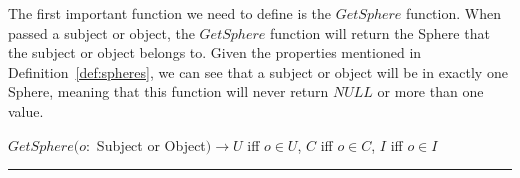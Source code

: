 

\noindent The first important function we need to define is the $GetSphere$
function. When passed a subject or object, the $GetSphere$ function will return
the Sphere that the subject or object belongs to. Given the properties mentioned
in Definition~\ref{def:spheres}, we can see that a subject or object will be in
exactly one Sphere, meaning that this function will never return $NULL$ or more
than one value.

\begin{definition}[GetSphere]\label{def:getsphere}
$GetSphere(o:$ Subject or Object$) \rightarrow U$ iff $o \in U$, $C$ iff $o \in 
C$, $I$ iff $o \in I$\\
\hrule \mbox{}\\
\end{definition}

